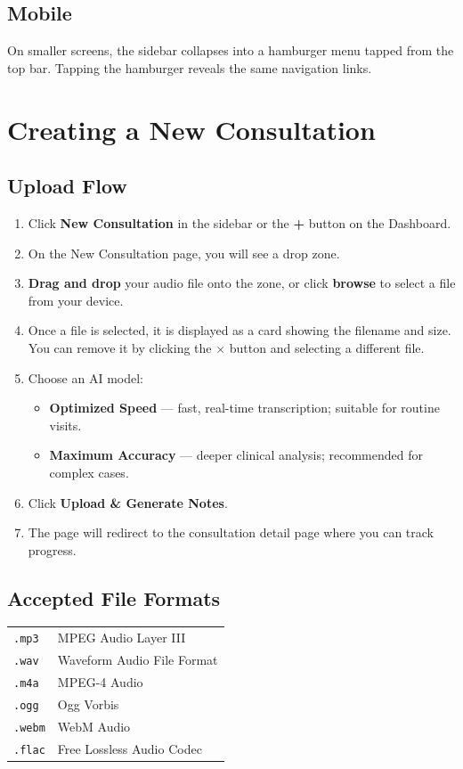 \documentclass[12pt,a4paper]{article}
\begin{document}
\subsection{Mobile}
On smaller screens, the sidebar collapses into a hamburger menu
tapped from the top bar. Tapping the hamburger reveals the same navigation links.

\section{Creating a New Consultation}

\subsection{Upload Flow}
\begin{enumerate}
	\item Click \textbf{New Consultation} in the sidebar or the \textbf{+} button on the Dashboard.
	\item On the New Consultation page, you will see a drop zone.
	\item \textbf{Drag and drop} your audio file onto the zone, or click \textbf{browse} to select a file from your device.
	\item Once a file is selected, it is displayed as a card showing the filename and size. You can remove it by clicking the $\times$ button and selecting a different file.
	\item Choose an AI model:
	      \begin{itemize}
		      \item \textbf{Optimized Speed} — fast, real-time transcription; suitable for routine visits.
		      \item \textbf{Maximum Accuracy} — deeper clinical analysis; recommended for complex cases.
	      \end{itemize}
	\item Click \textbf{Upload \& Generate Notes}.
	\item The page will redirect to the consultation detail page where you can track progress.
\end{enumerate}

\subsection{Accepted File Formats}
\begin{tabular}{@{}p{2.2cm}@{}p{11cm}@{}}
	\texttt{.mp3}  & MPEG Audio Layer III       \\
	\texttt{.wav}  & Waveform Audio File Format \\
	\texttt{.m4a}  & MPEG-4 Audio               \\
	\texttt{.ogg}  & Ogg Vorbis                 \\
	\texttt{.webm} & WebM Audio                 \\
	\texttt{.flac} & Free Lossless Audio Codec  \\
\end{tabular}
\end{document}
